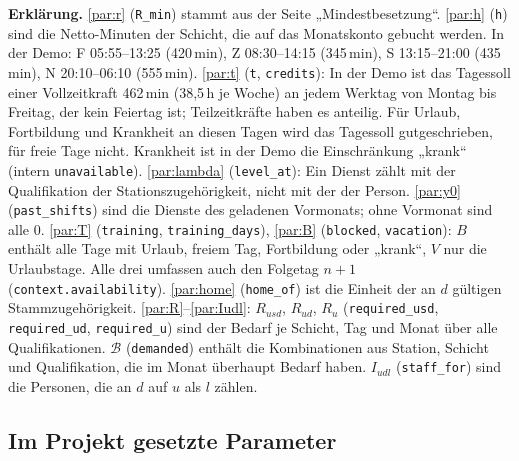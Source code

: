 \documentclass[11pt]{combiArticle}
\newcommand{\code}[1]{\texttt{#1}}
\begin{document}
\textbf{Erklärung.}
\eqref{par:r} (\code{R\_min}) stammt aus der Seite „Mindestbesetzung“.
\eqref{par:h} (\code{h}) sind die Netto-Minuten der Schicht, die auf das Monatskonto gebucht werden. In der
Demo: F 05:55--13:25 (420\,min), Z 08:30--14:15 (345\,min), S 13:15--21:00 (435\,min),
N 20:10--06:10 (555\,min).
\eqref{par:t} (\code{t}, \code{credits}): In der Demo ist das Tagessoll einer Vollzeitkraft 462\,min
(38,5\,h je Woche) an jedem Werktag von Montag bis Freitag, der kein Feiertag ist; Teilzeitkräfte haben es
anteilig. Für Urlaub, Fortbildung und Krankheit an diesen Tagen wird das Tagessoll gutgeschrieben, für freie
Tage nicht. Krankheit ist in der Demo die Einschränkung „krank“ (intern \code{unavailable}).
\eqref{par:lambda} (\code{level\_at}): Ein Dienst zählt mit der Qualifikation der Stationszugehörigkeit,
nicht mit der der Person.
\eqref{par:y0} (\code{past\_shifts}) sind die Dienste des geladenen Vormonats; ohne Vormonat sind alle 0.
\eqref{par:T} (\code{training}, \code{training\_days}), \eqref{par:B} (\code{blocked}, \code{vacation}): $B$
enthält alle Tage mit Urlaub, freiem Tag, Fortbildung oder „krank“, $V$ nur die Urlaubstage. Alle drei
umfassen auch den Folgetag $n+1$ (\code{context.availability}).
\eqref{par:home} (\code{home\_of}) ist die Einheit der an $d$ gültigen Stammzugehörigkeit.
\eqref{par:R}--\eqref{par:Iudl}: $R_{usd}$, $R_{ud}$, $R_u$ (\code{required\_usd}, \code{required\_ud},
\code{required\_u}) sind der Bedarf je Schicht, Tag und Monat über alle Qualifikationen. $\mathcal{B}$
(\code{demanded}) enthält die Kombinationen aus Station, Schicht und Qualifikation, die im Monat überhaupt
Bedarf haben. $I_{udl}$ (\code{staff\_for}) sind die Personen, die an $d$ auf $u$ als $l$ zählen.

\subsection{Im Projekt gesetzte Parameter}
\end{document}
